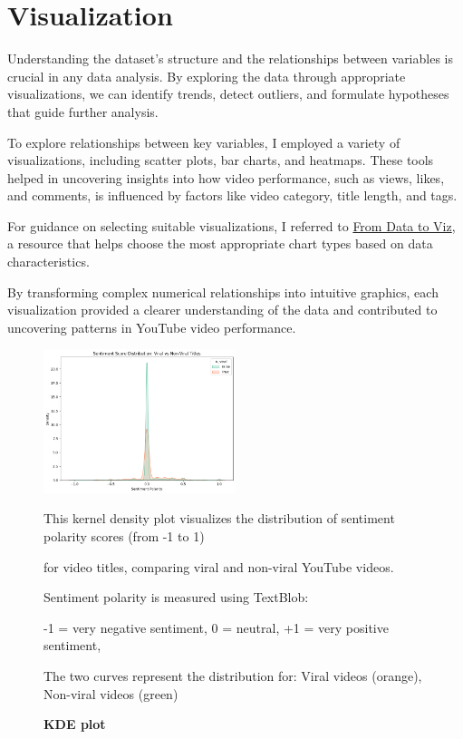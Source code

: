 \documentclass[a4paper]{article}
\begin{document}
\section{Visualization}
 Understanding the dataset’s structure and the relationships between variables is crucial in any data analysis. By exploring the data through appropriate visualizations, we can identify trends, detect outliers, and formulate hypotheses that guide further analysis.

To explore relationships between key variables, I employed a variety of visualizations, including scatter plots, bar charts, and heatmaps. These tools helped in uncovering insights into how video performance, such as views, likes, and comments, is influenced by factors like video category, title length, and tags.

For guidance on selecting suitable visualizations, I referred to 
\href{https://www.data-to-viz.com/}{From Data to Viz}, a resource that helps choose the most appropriate chart types based on data characteristics.

By transforming complex numerical relationships into intuitive graphics, each visualization provided a clearer understanding of the data and contributed to uncovering patterns in YouTube video performance.


\begin{figure}[h]
    \centering
    \includegraphics[width=0.5\textwidth]{kde.png}
    \caption{\textbf{KDE plot}}
    This kernel density plot visualizes the distribution of sentiment polarity scores (from -1 to 1) \
    
    for video titles, comparing viral and non-viral YouTube videos.
    
    Sentiment polarity is measured using TextBlob:
    
	-1 = very negative sentiment, 
	0 = neutral, 
	+1 = very positive sentiment, \
	
	The two curves represent the distribution for:
	Viral videos (orange), 
	Non-viral videos (green)
    \label{fig:sales}
\end{figure}
\end{document}
